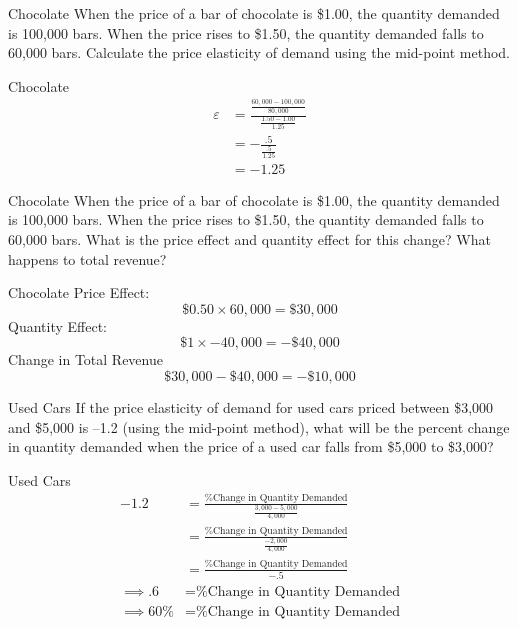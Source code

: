 \documentclass{beamer}
\begin{document}
\begin{frame}[t]{Chocolate}
    When the price of a bar of chocolate is \$1.00, the quantity demanded is 100,000 bars. When the price rises to \$1.50, the quantity demanded falls to 60,000 bars. Calculate the price elasticity of demand using the mid-point method.
\end{frame}

\begin{frame}{Chocolate}
    \[\begin{split}
        \varepsilon &= \frac{\frac{60,000 - 100,000}{80,000}}{\frac{1.50 - 1.00}{1.25}} \\
        &= -\frac{.5}{\frac{.5}{1.25}} \\
        &= \boxed{-1.25}
    \end{split}\]
\end{frame}

\begin{frame}[t]{Chocolate}
    When the price of a bar of chocolate is \$1.00, the quantity demanded is 100,000 bars. When the price rises to \$1.50, the quantity demanded falls to 60,000 bars. What is the price effect and quantity effect for this change? What happens to total revenue?
\end{frame}

\begin{frame}{Chocolate}
    Price Effect:
    \[\$0.50 \times 60,000 = \$30,000\]
    Quantity Effect:
    \[\$1 \times -40,000 = -\$40,000\]
    Change in Total Revenue
    \[\$30,000 - \$40,000 = -\$10,000\]
\end{frame}

\begin{frame}[t]{Used Cars}
    If the price elasticity of demand for used cars priced between \$3,000 and \$5,000 is –1.2 (using the mid-point method), what will be the percent change in quantity demanded when the price of a used car falls from \$5,000 to \$3,000?
\end{frame}

\begin{frame}{Used Cars}
    \[\begin{split}
        -1.2 &= \frac{\text{\% Change in Quantity Demanded}}{\frac{3,000 - 5,000}{4,000}} \\
        &=\frac{\text{\% Change in Quantity Demanded}}{\frac{-2,000}{4,000}} \\
        &=\frac{\text{\% Change in Quantity Demanded}}{-.5} \\
        \implies .6 &= \text{\% Change in Quantity Demanded} \\
        \implies \boxed{60\%} &= \text{\% Change in Quantity Demanded} 
    \end{split}\]
\end{frame}
\end{document}
